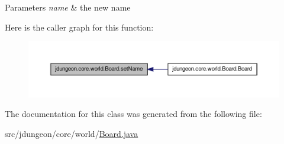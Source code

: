 \begin{DoxyParams}{Parameters}
{\em name} & the new name \\
\hline
\end{DoxyParams}


Here is the caller graph for this function:
\nopagebreak
\begin{figure}[H]
\begin{center}
\leavevmode
\includegraphics[width=400pt]{classjdungeon_1_1core_1_1world_1_1_board_abbffec68bb323c3596ee6da3f1bd104f_icgraph}
\end{center}
\end{figure}




The documentation for this class was generated from the following file:\begin{DoxyCompactItemize}
\item 
src/jdungeon/core/world/\hyperlink{_board_8java}{Board.java}\end{DoxyCompactItemize}
